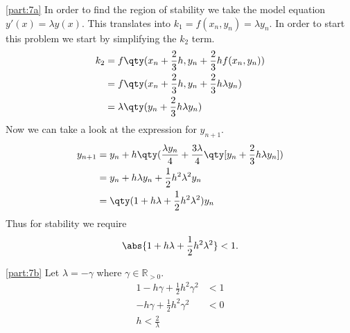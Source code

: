 \documentclass[boxes,pages]{homework}
\begin{document}
\begin{solution}
	\ref{part:7a}
	In order to find the region of stability we take the model equation $y'(x) = \lambda y(x)$. This translates into $k_1 = f(x_n, y_n) = \lambda y_n$. In order to start this problem we start by simplifying the $k_2$ term.
	\begin{align*}
		k_2 & = f\qty(x_n + \frac{2}{3}h, y_n + \frac{2}{3}hf(x_n, y_n)) \\
		    & = f\qty(x_n + \frac{2}{3}h, y_n + \frac{2}{3}h\lambda y_n) \\
		    & = \lambda\qty(y_n + \frac{2}{3}h\lambda y_n)
	\end{align*}
	Now we can take a look at the expression for $y_{n+1}$.
	\begin{align*}
		y_{n+1} & = y_n + h\qty(\frac{\lambda y_n}{4} + \frac{3\lambda}{4}\qty[y_n + \frac{2}{3}h\lambda y_n]) \\
		        & = y_n + h\lambda y_n + \frac{1}{2}h^2\lambda^2 y_n                                           \\
		        & = \qty(1 + h\lambda + \frac{1}{2}h^2\lambda^2)y_n
	\end{align*}
	Thus for stability we require
	\begin{equation*}
		\abs{1 + h\lambda + \frac{1}{2}h^2\lambda^2} < 1.
	\end{equation*}

	\ref{part:7b}
	Let $\lambda = -\gamma$ where $\gamma\in\mathbb{R}_{>0}$.
	\begin{align*}
		1 - h\gamma + \frac{1}{2}h^2\gamma^2 & < 1 \\
		- h\gamma + \frac{1}{2}h^2\gamma^2   & < 0 \\
		h < \frac{2}{\lambda}
	\end{align*}
\end{solution}
\end{document}
